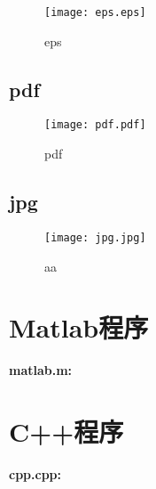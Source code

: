 \documentclass[bwprint]{cumcmthesis}
\begin{document}
\begin{figure}[h]
	\centering
	\texttt{[image: eps.eps]}
	\caption{eps}
\end{figure}
\clearpage
\subsection{pdf}

\begin{figure}[h]
	\centering
	\texttt{[image: pdf.pdf]}
	\caption{pdf}
\end{figure}
\clearpage
\subsection{jpg}

\begin{figure}[h]
	\small
	\centering
	\texttt{[image: jpg.jpg]}
	\caption{aa}
\end{figure}
\clearpage


\nocite{*}


\newpage
\appendix
\section{Matlab程序}

\textcolor[rgb]{0.98,0.00,0.00}{\textbf{matlab.m:}}



\section{C++程序}

\textcolor[rgb]{0.98,0.00,0.00}{\textbf{cpp.cpp:}}


\end{document}
